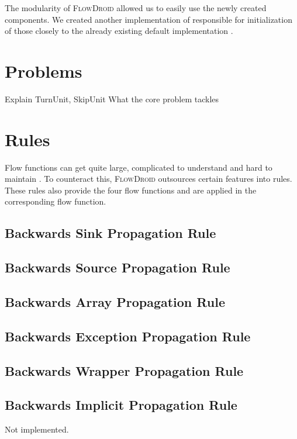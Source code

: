 \documentclass[../draft.tex]{subfiles}
\begin{document}
    The modularity of \textsc{FlowDroid} allowed us to easily use the newly created components. We created another implementation of  responsible for initialization of those closely to the already existing default implementation .

    \section{Problems}\label{s:problems}

    Explain TurnUnit, SkipUnit
    What the core problem tackles

    \section{Rules}
    Flow functions can get quite large, complicated to understand and hard to maintain \cite{Lerch2015}. To counteract this, \textsc{FlowDroid} outsources certain features into rules. These rules also provide the four flow functions and are applied in the corresponding flow function.

    \subsection{Backwards Sink Propagation Rule}


    \subsection{Backwards Source Propagation Rule}\label{s:sourcerule}

    \subsection{Backwards Array Propagation Rule}

    \subsection{Backwards Exception Propagation Rule}

    \subsection{Backwards Wrapper Propagation Rule}

    \subsection{Backwards Implicit Propagation Rule}
    Not implemented.
\end{document}
